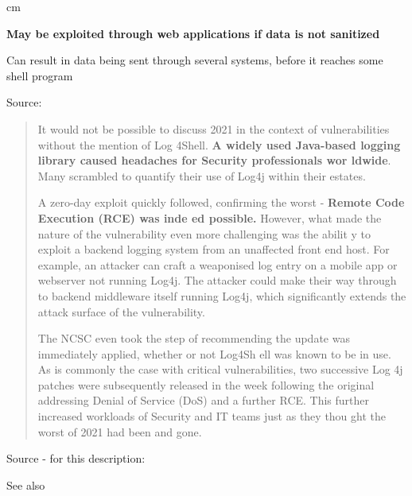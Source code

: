 \documentclass[Screen16to9,17pt]{foils}
\begin{document}
 cm

\centerline{\bfseries May be exploited through web applications if data is not sanitized}




Can result in data being sent through several systems, before it reaches some shell program

Source:




\begin{quote}\small
It would not be possible to discuss 2021 in the context of vulnerabilities without the mention of Log
4Shell. {\bf A widely used Java-based logging library caused headaches for Security professionals wor
ldwide}. Many scrambled to quantify their use of Log4j within their estates.

A zero-day exploit quickly followed, confirming the worst - {\bf Remote Code Execution (RCE) was inde
ed possible.} However, what made the nature of the vulnerability even more challenging was the abilit
y to exploit a backend logging system from an unaffected front end host. For example, an attacker can
 craft a weaponised log entry on a mobile app or webserver not running Log4j. The attacker could make
 their way through to backend middleware itself running Log4j, which significantly extends the attack
 surface of the vulnerability.

The NCSC even took the step of recommending the update was immediately applied, whether or not Log4Sh
ell was known to be in use. As is commonly the case with critical vulnerabilities, two successive Log
4j patches were subsequently released in the week following the original addressing Denial of Service
 (DoS) and a further RCE. This further increased workloads of Security and IT teams just as they thou
ght the worst of 2021 had been and gone.
\end{quote}
Source - for this description:\\

See also 





\end{document}
